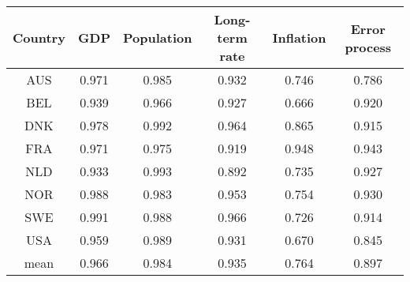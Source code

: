 % 
\begin{tabular}{cccccc}
  \hline
  Country & GDP & Population & Long-term rate & Inflation & Error process\\
 \hline
AUS & 0.971 & 0.985 & 0.932 & 0.746 & 0.786 \\ 
  BEL & 0.939 & 0.966 & 0.927 & 0.666 & 0.920 \\ 
  DNK & 0.978 & 0.992 & 0.964 & 0.865 & 0.915 \\ 
  FRA & 0.971 & 0.975 & 0.919 & 0.948 & 0.943 \\ 
  NLD & 0.933 & 0.993 & 0.892 & 0.735 & 0.927 \\ 
  NOR & 0.988 & 0.983 & 0.953 & 0.754 & 0.930 \\ 
  SWE & 0.991 & 0.988 & 0.966 & 0.726 & 0.914 \\ 
  USA & 0.959 & 0.989 & 0.931 & 0.670 & 0.845 \\ 
  mean & 0.966 & 0.984 & 0.935 & 0.764 & 0.897 \\ 
   \hline
\end{tabular}
